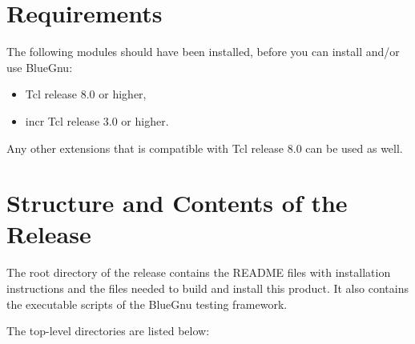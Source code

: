 \section{Requirements}
The following modules should have been installed, before you can
install and/or use BlueGnu:

\begin{itemize}
\item Tcl release 8.0 or higher,
\item incr Tcl release 3.0 or higher.
\end{itemize}

Any other extensions that is compatible with Tcl release 8.0 can be used
as well.

\section{Structure and Contents of the Release}

The root directory of the release contains the README files with
installation instructions and the files needed to build and install
this product. It also contains the executable scripts of the
BlueGnu testing framework.

The top-level directories are listed below:

